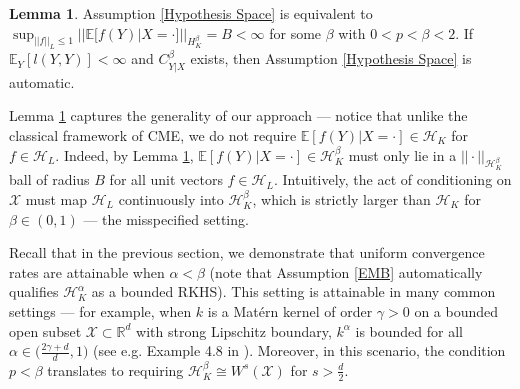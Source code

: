 \documentclass[accepted]{article}
\theoremstyle{definition}
\newtheorem{lemma}[theorem]{Lemma}
\begin{document}
\begin{lemma}
\label{Characterization of Hypothesis Space}
Assumption \ref{Hypothesis Space} is equivalent to $\sup_{||f||_{L} \leq 1} ||\mathbb{E}[f(Y)| X = \cdot]||_{H^{\beta}_K} = B < \infty$ for some $\beta$ with $0 < p < \beta < 2$. If $\mathbb{E}_{Y}[l(Y, Y)] < \infty$ and $C^{\beta}_{Y|X}$ exists, then Assumption \ref{Hypothesis Space} is automatic.
\end{lemma}


\par Lemma \ref{Characterization of Hypothesis Space} captures the generality of our approach --- notice that unlike the classical framework of CME, we do not require $\mathbb{E}[f(Y)| X = \cdot] \in \mathcal{H}_K$ for $f \in \mathcal{H}_L$. Indeed, by Lemma \ref{Characterization of Hypothesis Space}, $\mathbb{E}[f(Y)| X = \cdot] \in \mathcal{H}^{\beta}_K$ must only lie in a $||\cdot||_{\mathcal{H}^{\beta}_K}$ ball of radius $B$ for all unit vectors $f \in \mathcal{H}_{L}$. Intuitively, the act of conditioning on $\mathcal{X}$ must map $\mathcal{H}_{L}$ continuously into $\mathcal{H}^{\beta}_K$, which is strictly larger than $\mathcal{H}_{K}$ for $\beta \in (0, 1)$ --- the misspecified setting. 

\par Recall that in the previous section, we demonstrate that uniform convergence rates are attainable when $\alpha < \beta$ (note that Assumption \ref{EMB} automatically qualifies $\mathcal{H}^{\alpha}_K$ as a bounded RKHS). This setting is attainable in many common settings --- for example, when $k$ is a Mat\'{e}rn kernel of order $\gamma > 0$ on a bounded open subset $\mathcal{X} \subset \mathbb{R}^d$ with strong Lipschitz boundary, $k^{\alpha}$ is bounded for all $\alpha \in \Big(\frac{2\gamma + d}{d}, 1\Big)$ (see e.g. Example 4.8 in \cite{steinwart2019convergence}). Moreover, in this scenario, the condition $p < \beta$ translates to requiring $\mathcal{H}_{K}^{\beta} \cong W^{s}(\mathcal{X})$ for $s > \frac{d}{2}$.
\end{document}
